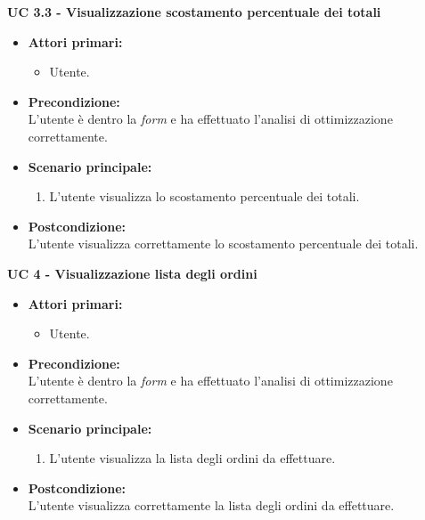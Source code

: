 \vspace{0.5cm}

\noindent \textbf{\large UC 3.3 - Visualizzazione scostamento percentuale dei totali}
\label{uc:visualizzazione-scostamento-percentuale-totali}
\begin{itemize}

	\item \textbf{Attori primari: }
		\begin{itemize}
			\item Utente.
		\end{itemize}

	\item \textbf{Precondizione: }\\[0.3cm]
		L'utente è dentro la \textit{form} e ha effettuato l'analisi di ottimizzazione correttamente.

	\item \textbf{Scenario principale: }
		\begin{enumerate}
			\item L'utente visualizza lo scostamento percentuale dei totali.
		\end{enumerate}
		

	\item \textbf{Postcondizione: }\\[0.3cm]
		L'utente visualizza correttamente lo scostamento percentuale dei totali.

\end{itemize}

\vspace{0.5cm}

\noindent \textbf{\large UC 4 - Visualizzazione lista degli ordini}
\label{uc:visualizzazione-lista-ordini}
\begin{itemize}

	\item \textbf{Attori primari: }
		\begin{itemize}
			\item Utente.
		\end{itemize}

	\item \textbf{Precondizione: }\\[0.3cm]
		L'utente è dentro la \textit{form} e ha effettuato l'analisi di ottimizzazione correttamente.

	\item \textbf{Scenario principale: }
		\begin{enumerate}
			\item L'utente visualizza la lista degli ordini da effettuare.
		\end{enumerate}
		

	\item \textbf{Postcondizione: }\\[0.3cm]
		L'utente visualizza correttamente la lista degli ordini da effettuare.

\end{itemize}

